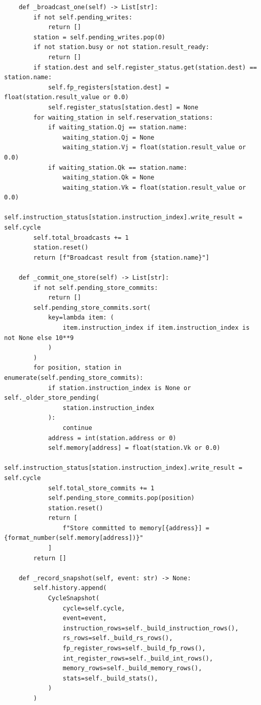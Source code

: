 \documentclass[12pt,a4paper]{ctexart}
\begin{document}
\begin{lstlisting}
    def _broadcast_one(self) -> List[str]:
        if not self.pending_writes:
            return []
        station = self.pending_writes.pop(0)
        if not station.busy or not station.result_ready:
            return []
        if station.dest and self.register_status.get(station.dest) == station.name:
            self.fp_registers[station.dest] = float(station.result_value or 0.0)
            self.register_status[station.dest] = None
        for waiting_station in self.reservation_stations:
            if waiting_station.Qj == station.name:
                waiting_station.Qj = None
                waiting_station.Vj = float(station.result_value or 0.0)
            if waiting_station.Qk == station.name:
                waiting_station.Qk = None
                waiting_station.Vk = float(station.result_value or 0.0)
        self.instruction_status[station.instruction_index].write_result = self.cycle
        self.total_broadcasts += 1
        station.reset()
        return [f"Broadcast result from {station.name}"]

    def _commit_one_store(self) -> List[str]:
        if not self.pending_store_commits:
            return []
        self.pending_store_commits.sort(
            key=lambda item: (
                item.instruction_index if item.instruction_index is not None else 10**9
            )
        )
        for position, station in enumerate(self.pending_store_commits):
            if station.instruction_index is None or self._older_store_pending(
                station.instruction_index
            ):
                continue
            address = int(station.address or 0)
            self.memory[address] = float(station.Vk or 0.0)
            self.instruction_status[station.instruction_index].write_result = self.cycle
            self.total_store_commits += 1
            self.pending_store_commits.pop(position)
            station.reset()
            return [
                f"Store committed to memory[{address}] = {format_number(self.memory[address])}"
            ]
        return []

    def _record_snapshot(self, event: str) -> None:
        self.history.append(
            CycleSnapshot(
                cycle=self.cycle,
                event=event,
                instruction_rows=self._build_instruction_rows(),
                rs_rows=self._build_rs_rows(),
                fp_register_rows=self._build_fp_rows(),
                int_register_rows=self._build_int_rows(),
                memory_rows=self._build_memory_rows(),
                stats=self._build_stats(),
            )
        )


\end{lstlisting}
\end{document}
